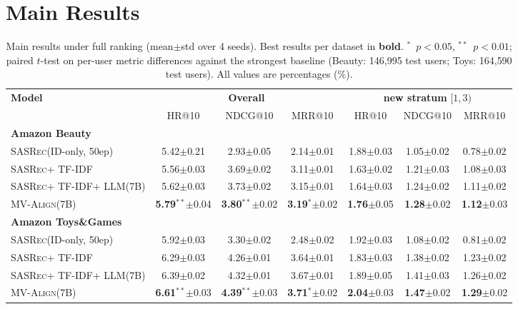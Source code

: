 \documentclass[sigconf,natbib=true,anonymous]{acmart}
\newcommand{\model}{\textsc{MV-Align}\xspace}
\newcommand{\base}{\textsc{SASRec}\xspace}
\newcommand{\tfidf}{\textsc{TF-IDF}\xspace}
\newcommand{\llm}{\textsc{LLM}\xspace}
\begin{document}
\section{Main Results}\label{sec:main_results}

\begin{table}[t]
\caption{Main results under full ranking (mean$\pm$std over 4 seeds). Best results per dataset in \textbf{bold}. $^{*}$~$p{<}0.05$, $^{**}$~$p{<}0.01$; paired $t$-test on per-user metric differences against the strongest baseline (Beauty: 146{,}995 test users; Toys: 164{,}590 test users). All values are percentages (\%).}
\label{tab:main}
\centering
\small
\begin{tabular}{lcccccc}
\toprule
\multirow{2}{*}{\textbf{Model}} &
\multicolumn{3}{c}{\textbf{Overall}} &
\multicolumn{3}{c}{\textbf{new stratum} $[1,3)$} \\
\cmidrule(lr){2-4}\cmidrule(lr){5-7}
& HR@10 & NDCG@10 & MRR@10 & HR@10 & NDCG@10 & MRR@10 \\
\midrule
\multicolumn{7}{l}{\textbf{Amazon Beauty}} \\
\base (ID-only, 50ep) & 5.42$\pm$0.21 & 2.93$\pm$0.05 & 2.14$\pm$0.01 & 1.88$\pm$0.03 & 1.05$\pm$0.02 & 0.78$\pm$0.02 \\
\base + \tfidf & 5.56$\pm$0.03 & 3.69$\pm$0.02 & 3.11$\pm$0.01 & 1.63$\pm$0.02 & 1.21$\pm$0.03 & 1.08$\pm$0.03 \\
\base + \tfidf + \llm (7B) & 5.62$\pm$0.03 & 3.73$\pm$0.02 & 3.15$\pm$0.01 & 1.64$\pm$0.03 & 1.24$\pm$0.02 & 1.11$\pm$0.02 \\
\model (7B) & \textbf{5.79}$^{**}$$\pm$0.04 & \textbf{3.80}$^{**}$$\pm$0.02 & \textbf{3.19}$^{*}$$\pm$0.02 & \textbf{1.76}$\pm$0.05 & \textbf{1.28}$\pm$0.02 & \textbf{1.12}$\pm$0.03 \\
\midrule
\multicolumn{7}{l}{\textbf{Amazon Toys\&Games}} \\
\base (ID-only, 50ep) & 5.92$\pm$0.03 & 3.30$\pm$0.02 & 2.48$\pm$0.02 & 1.92$\pm$0.03 & 1.08$\pm$0.02 & 0.81$\pm$0.02 \\
\base + \tfidf & 6.29$\pm$0.03 & 4.26$\pm$0.01 & 3.64$\pm$0.01 & 1.83$\pm$0.03 & 1.38$\pm$0.02 & 1.23$\pm$0.02 \\
\base + \tfidf + \llm (7B) & 6.39$\pm$0.02 & 4.32$\pm$0.01 & 3.67$\pm$0.01 & 1.89$\pm$0.05 & 1.41$\pm$0.03 & 1.26$\pm$0.02 \\
\model (7B) & \textbf{6.61}$^{**}$$\pm$0.03 & \textbf{4.39}$^{**}$$\pm$0.03 & \textbf{3.71}$^{*}$$\pm$0.02 & \textbf{2.04}$\pm$0.03 & \textbf{1.47}$\pm$0.02 & \textbf{1.29}$\pm$0.02 \\
\bottomrule
\end{tabular}
\end{table}
\end{document}
